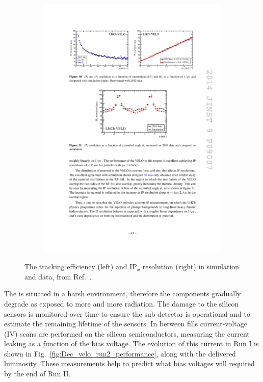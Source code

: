 \begin{figure}[!h]
\begin{subfigure}[t]{0.4\textwidth}
        \includegraphics[width=1.0\textwidth]{figs/Detector/velo_ipx_resolution.pdf}
    \end{subfigure}
    \caption{The tracking efficiency (left) and $\text{IP}_{x}$ resolution (right) in simulation and data, from Ref.~\cite{LHCb-DP-2014-001}.}
    \label{fig:Dec_velo_track_performance}   
\end{figure}

The \velo is situated in a harsh environment, therefore the components gradually degrade as exposed to more and more radiation. The damage to the silicon sensors is monitored over time to ensure the sub-detector is operational and to estimate the remaining lifetime of the sensors. In between \lhc fills current-voltage (IV) scans are performed on the silicon semiconductors, measuring the current leaking as a function of the bias voltage. The evolution of this current in Run I is shown in Fig.~\ref{fig:Dec_velo_run2_performance}, along with the delivered luminosity. These measurements help to predict what bias voltages will required by the end of Run II. 


